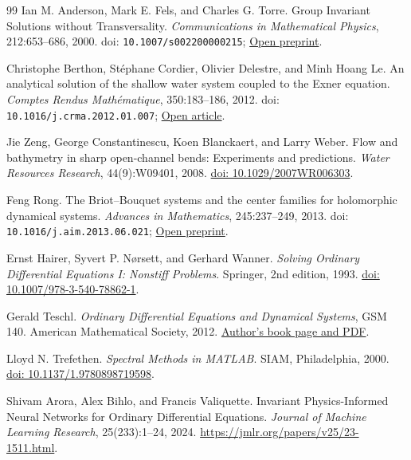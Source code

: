\documentclass[12pt,a4paper,oneside]{report}
\numberwithin{equation}{chapter}
\theoremstyle{definition}
\theoremstyle{remark}\newtheorem{remark}[theorem]{Remark}
\newcommand{\doi}[1]{\href{https://doi.org/#1}{doi: #1}}
\begin{document}
\begin{thebibliography}{99}
Ian M. Anderson, Mark E. Fels, and Charles G. Torre. Group Invariant Solutions without Transversality. \emph{Communications in Mathematical Physics}, 212:653--686, 2000. doi: \nolinkurl{10.1007/s002200000215}; \href{https://arxiv.org/abs/math-ph/9910015}{Open preprint}.

Christophe Berthon, St\'ephane Cordier, Olivier Delestre, and Minh Hoang Le. An analytical solution of the shallow water system coupled to the Exner equation. \emph{Comptes Rendus Math\'ematique}, 350:183--186, 2012. doi: \nolinkurl{10.1016/j.crma.2012.01.007}; \href{https://www.numdam.org/item/10.1016/j.crma.2012.01.007.pdf}{Open article}.

Jie Zeng, George Constantinescu, Koen Blanckaert, and Larry Weber. Flow and bathymetry in sharp open-channel bends: Experiments and predictions. \emph{Water Resources Research}, 44(9):W09401, 2008. \doi{10.1029/2007WR006303}.

Feng Rong. The Briot--Bouquet systems and the center families for holomorphic dynamical systems. \emph{Advances in Mathematics}, 245:237--249, 2013. doi: \nolinkurl{10.1016/j.aim.2013.06.021}; \href{https://arxiv.org/pdf/1307.3823}{Open preprint}.

Ernst Hairer, Syvert P. N{\o}rsett, and Gerhard Wanner. \emph{Solving Ordinary Differential Equations I: Nonstiff Problems}. Springer, 2nd edition, 1993. \doi{10.1007/978-3-540-78862-1}.

Gerald Teschl. \emph{Ordinary Differential Equations and Dynamical Systems}, GSM 140. American Mathematical Society, 2012. \href{https://www.mat.univie.ac.at/~gerald/ftp/book-ode/}{Author's book page and PDF}.

Lloyd N. Trefethen. \emph{Spectral Methods in MATLAB}. SIAM, Philadelphia, 2000. \doi{10.1137/1.9780898719598}.

Shivam Arora, Alex Bihlo, and Francis Valiquette. Invariant Physics-Informed Neural Networks for Ordinary Differential Equations. \emph{Journal of Machine Learning Research}, 25(233):1--24, 2024. \url{https://jmlr.org/papers/v25/23-1511.html}.


\end{thebibliography}
\end{document}
